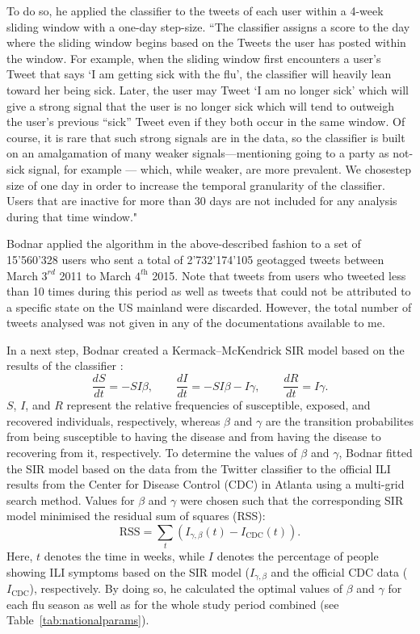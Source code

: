 \documentclass[11pt, a4paper,twoside]{report}\usepackage[]{graphicx}\usepackage[]{color}
\begin{document}
To do so, he applied the classifier to the tweets of each user within a 4-week sliding window with a one-day step-size. ``The classifier assigns a score to the day where the sliding window begins based on the Tweets the user has posted within the window. For example, when the sliding window first encounters a user’s Tweet that says `I am getting sick with the flu', the classifier will heavily lean toward her being sick. Later, the user may Tweet `I am no longer sick' which will give a strong signal that the user is no longer sick which will tend to outweigh the user’s previous “sick” Tweet even if they both occur in the same window. Of course, it is rare that such strong signals are in the data, so the classifier is built on an amalgamation of many weaker signals—mentioning going to a party as not-sick signal, for example --- which, while weaker, are more prevalent. We chosestep size of one day in order to increase the temporal granularity of the classifier. Users that are inactive for more than 30 days are not included for any analysis during that time window."

Bodnar applied the algorithm in the above-described fashion to a set of 15'560'328 users who sent a total of 2'732'174'105 geotagged tweets between March $3^\textit{rd}$ 2011 to March $4^\textit{th}$ 2015. Note that tweets from users who tweeted less than 10 times during this period as well as tweets that could not be attributed to a specific state on the US mainland were discarded. However, the total number of tweets analysed was not given in any of the documentations available to me. 

In a next step, Bodnar created a Kermack--McKendrick SIR model based on the results of the classifier \citep{martcheva2015introduction}:
$$\frac{dS}{dt} = -SI\beta, \qquad \frac{dI}{dt} = -SI\beta - I\gamma, \qquad \frac{dR}{dt} = I\gamma.$$
$S$, $I$, and $R$ represent the relative frequencies of susceptible, exposed, and recovered individuals, respectively, whereas $\beta$ and $\gamma$ are the transition probabilites from being susceptible to having the disease and from having the disease to recovering from it, respectively. To determine the values of $\beta$ and $\gamma$, Bodnar fitted the SIR model based on the data from the Twitter classifier to the official ILI results from the Center for Disease Control (CDC) in Atlanta using a multi-grid search method. Values for $\beta$ and $\gamma$ were chosen such that the corresponding SIR model minimised the residual sum of squares (RSS):
$$\text{RSS} = \sum_{t}(I_{\gamma, \beta}(t)-I_{\text{CDC}}(t)).$$
Here, $t$ denotes the time in weeks, while $I$ denotes the percentage of people showing ILI symptoms based on the SIR model ($I_{\gamma, \beta}$ and the official CDC data ($I_{\text{CDC}}$), respectively. By doing so, he calculated the optimal values of $\beta$ and $\gamma$ for each flu season as well as for the whole study period combined (see Table~\ref{tab:nationalparams}). 
\end{document}

